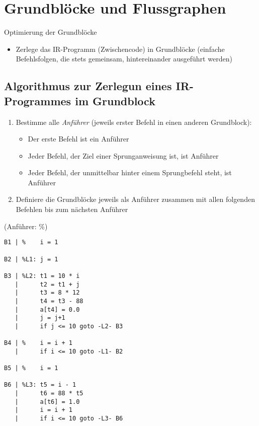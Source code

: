 \section{Grundblöcke und Flussgraphen}
Optimierung der Grundblöcke
\begin{itemize}
 \item Zerlege das IR-Programm (Zwischencode) in Grundblöcke (einfache Befehlsfolgen, die stets gemeinsam, hintereinander ausgeführt werden)
\end{itemize}
\subsection{Algorithmus zur Zerlegun eines IR-Programmes im Grundblock}
\begin{enumerate}
 \item Bestimme alle \emph{Anführer} (jeweils erster Befehl in einen anderen Grundblock):
     \begin{itemize}
      \item Der erste Befehl ist ein Anführer
      \item Jeder Befehl, der Ziel einer Sprunganweisung ist, ist Anführer
      \item Jeder Befehl, der unmittelbar hinter einem Sprungbefehl steht, ist Anführer
     \end{itemize}
 \item Definiere die Grundblöcke jeweils als Anführer zusammen mit allen folgenden Befehlen bis zum nächsten Anführer
\end{enumerate}
(Anführer: \%)
 \begin{verbatim}
B1 | %    i = 1

B2 | %L1: j = 1

B3 | %L2: t1 = 10 * i
   |      t2 = t1 + j
   |      t3 = 8 * 12
   |      t4 = t3 - 88
   |      a[t4] = 0.0
   |      j = j+1
   |      if j <= 10 goto -L2- B3

B4 | %    i = i + 1
   |      if i <= 10 goto -L1- B2

B5 | %    i = 1

B6 | %L3: t5 = i - 1
   |      t6 = 88 * t5
   |      a[t6] = 1.0
   |      i = i + 1
   |      if i <= 10 goto -L3- B6
 \end{verbatim}

